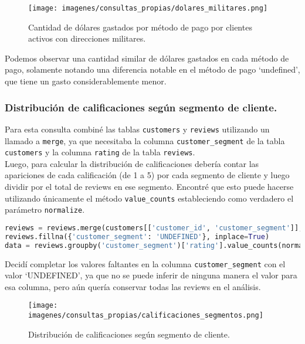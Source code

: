 \begin{figure}[H]
    \centering
    \texttt{[image: imagenes/consultas\_propias/dolares\_militares.png]}
    \caption{Cantidad de dólares gastados por método de pago por clientes activos con direcciones militares.}
    \label{fig:dolares_militares}
\end{figure}

Podemos observar una cantidad similar de dólares gastados en cada método de pago, solamente notando una diferencia notable en el método de pago `undefined', que tiene un gasto considerablemente menor.

\subsubsection{Distribución de calificaciones según segmento de cliente.}

Para esta consulta combiné las tablas \texttt{customers} y \texttt{reviews} utilizando un llamado a \texttt{merge}, ya que necesitaba la columna \texttt{customer\_segment} de la tabla \texttt{customers} y la columna \texttt{rating} de la tabla \texttt{reviews}. \\
Luego, para calcular la distribución de calificaciones debería contar las apariciones de cada calificación (de 1 a 5) por cada segmento de cliente y luego dividir por el total de reviews en ese segmento. Encontré que esto puede hacerse utilizando únicamente el método \texttt{value\_counts} estableciendo como verdadero el parámetro \texttt{normalize}.
\begin{lstlisting}[language=Python, xleftmargin=20pt, xrightmargin=20pt]
reviews = reviews.merge(customers[['customer_id', 'customer_segment']], on='customer_id', how='left')
reviews.fillna({'customer_segment': 'UNDEFINED'}, inplace=True)
data = reviews.groupby('customer_segment')['rating'].value_counts(normalize=True).unstack()
\end{lstlisting}
Decidí completar los valores faltantes en la columna \texttt{customer\_segment} con el valor `UNDEFINED', ya que no se puede inferir de ninguna manera el valor para esa columna, pero aún quería conservar todas las reviews en el análisis. 

\begin{figure}[H]
    \centering
    \texttt{[image: imagenes/consultas\_propias/calificaciones\_segmentos.png]}
    \caption{Distribución de calificaciones según segmento de cliente.}
    \label{fig:distribucion_calificaciones}
\end{figure}

